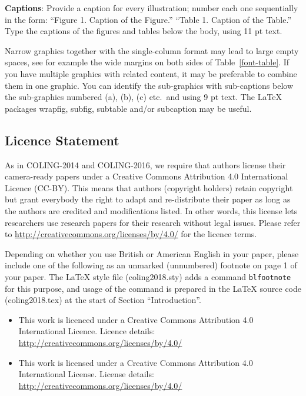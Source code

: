 {\bf Captions}: Provide a caption for every illustration; number each one
sequentially in the form:  ``Figure 1. Caption of the Figure.'' ``Table 1.
Caption of the Table.''  Type the captions of the figures and 
tables below the body, using 11 pt text.

Narrow graphics together with the single-column format may lead to
large empty spaces,
see for example the wide margins on both sides of Table~\ref{font-table}.
If you have multiple graphics with related content, it may be
preferable to combine them in one graphic.
You can identify the sub-graphics with sub-captions below the
sub-graphics numbered (a), (b), (c) etc.\ and using 9 pt text.
The \LaTeX{} packages wrapfig, subfig, subtable and/or subcaption
may be useful.


\subsection{Licence Statement}
\label{licence}

As in COLING-2014 and COLING-2016, 
we require that authors license their
camera-ready papers under a
Creative Commons Attribution 4.0 International Licence
(CC-BY).
This means that authors (copyright holders) retain copyright but
grant everybody 
the right to adapt and re-distribute their paper 
as long as the authors are credited and modifications listed.
In other words, this license lets researchers use research papers for their research without legal issues.
Please refer to 
\url{http://creativecommons.org/licenses/by/4.0/} for the
licence terms.  

Depending on whether you use British or American English in your
paper, please include one of the following as an unmarked
(unnumbered) footnote on page 1 of your paper.
The \LaTeX{} style file (coling2018.sty) adds a command
\texttt{blfootnote} for this purpose, and usage of the command is
prepared in the \LaTeX{} source code (coling2018.tex) at the start
of Section ``Introduction''.

\begin{itemize}
    \item  This work is licenced under a Creative Commons Attribution 4.0 International Licence. Licence details: \url{http://creativecommons.org/licenses/by/4.0/}
           
    \item This work is licensed under a Creative Commons Attribution 4.0 International License. License details: \url{http://creativecommons.org/licenses/by/4.0/}
           
           
           
\end{itemize}

